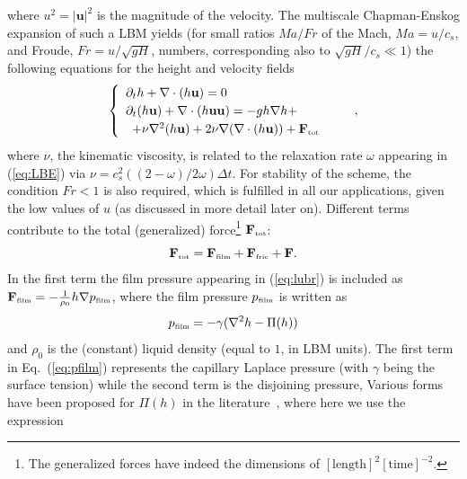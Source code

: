 where $u^2 = |\mathbf{u}|^2$ is the magnitude of the velocity.
The multiscale Chapman-Enskog expansion \cite{Chapman,Enskog} of such a
LBM yields (for small ratios $Ma/Fr$
of the Mach, $Ma=u/c_s$, and Froude, $Fr = u/\sqrt{gH}$, numbers,
corresponding also to $\sqrt{g H}/c_s \ll 1$) the following equations
for the height and velocity fields~\cite{PhysRevE.65.036309,van2010study,Salmon:1999:0022-2402:503}
\begin{equation}\label{eq:hydro}
\begin{cases}
\begin{array}{ll}
\partial_t h + \nabla \cdot (h \mathbf{u})  = 0 & \\ 
\partial_t (h \mathbf{u}) + \nabla \cdot (h \mathbf{u}\mathbf{u}) = -gh \nabla h +\\ 
\,\,\, +  \nu \nabla^2 (h\mathbf{u}) + 2\nu \nabla (\nabla \cdot (h\mathbf{u})) +
\mathbf{F}_{\mbox{\tiny{tot}}} 
\end{array}
\end{cases},
\end{equation}
where $\nu$, the kinematic viscosity, is related to the relaxation rate $\omega$ appearing
in (\ref{eq:LBE}) via $\nu = c_s^2((2-\omega)/2\omega)\Delta t$. 
For stability of the scheme, the condition $Fr < 1$
is also required, which is fulfilled in all our applications,
given the low values of $u$ (as discussed in more detail later on).
Different terms contribute to the total (generalized) force\footnote{The generalized forces have
indeed the dimensions of $[\mbox{length}]^2[\mbox{time}]^{-2}$.}
$\mathbf{F}_{\mbox{\tiny{tot}}}$:
\begin{equation}\label{eq:force}
\mathbf{F}_{\mbox{\tiny{tot}}} = \mathbf{F}_{\mbox{\tiny{film}}} + \mathbf{F}_{\mbox{\tiny{fric}}} + \mathbf{F}. 
\end{equation}
In the first term the film pressure appearing in (\ref{eq:lubr}) is included as
$\mathbf{F}_{\mbox{\tiny{film}}} = -\frac{1}{\rho_0}h\nabla p_{\mbox{\tiny{film}}}$, where the film pressure $p_{\mbox{\tiny{film}}}$ 
is written as
\begin{equation}\label{eq:pfilm}
p_{\mbox{\tiny{film}}} = - \gamma (\nabla^2 h -\Pi(h))
\end{equation}
and $\rho_0$ is the (constant) liquid density 
(equal to $1$, in LBM units). 
The first term in Eq.~(\ref{eq:pfilm}) represents the capillary Laplace pressure (with $\gamma$
being the surface tension) while the second term is the disjoining pressure,
Various forms have been proposed for $\Pi(h)$ in the
literature~\cite{oronLongscaleEvolutionThin1997,thielePatternedDepositionMoving2014}, where here we use the expression
